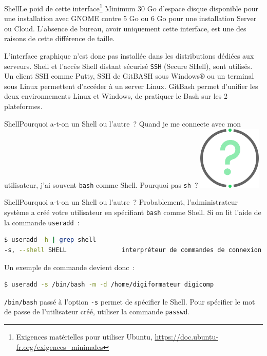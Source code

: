 \documentclass{beamer}
\begin{document}
    \begin{frame}{Shell}{Le poid de cette interface\footnote{Exigences matérielles pour utiliser Ubuntu, \url{https://doc.ubuntu-fr.org/exigences_minimales}}}
        Minimum 30 Go d'espace disque disponible pour une installation avec GNOME contre 5 Go ou 6 Go pour une installation Server ou Cloud.
        \bigbreak
        L'absence de bureau, avoir uniquement cette interface, est une des raisons de cette différence de taille.

        L'interface graphique n'est donc pas installée dans les distributions dédiées aux serveurs.
        Shell et l'accès Shell distant sécurisé \lstinline{SSH} (Secure SHell), sont utilisés.
        Un client SSH comme Putty, SSH de GitBASH sous Windows® ou un terminal sous Linux permettent d'accéder à un server Linux.
        \bigbreak
        GitBash permet d'unifier les deux environnements Linux et Windows, de pratiquer le Bash sur les 2 plateformes.
    \end{frame}

    \begin{frame}{Shell}{Pourquoi a-t-on un Shell ou l'autre~?}
        Quand je me connecte avec mon utilisateur, j'ai souvent \lstinline{bash} comme Shell.
        Pourquoi pas \lstinline{sh}~?
        \bigbreak
        \centering
        \includegraphics[width=3cm]{image/question-mark}
    \end{frame}

    \begin{frame}[fragile]{Shell}{Pourquoi a-t-on un Shell ou l'autre~?}
        Probablement, l'administrateur système a créé votre utilisateur en spécifiant \lstinline{bash} comme Shell.
        \bigbreak
        Si on lit l'aide de la commande \lstinline{useradd}~:
        \begin{lstlisting}[language=bash]
$ useradd -h | grep shell
-s, --shell SHELL               interpréteur de commandes de connexion du nouveau compte
        \end{lstlisting}
        \bigbreak
        Un exemple de commande devient donc~:
        \begin{lstlisting}[language=bash]
$ useradd -s /bin/bash -m -d /home/digiformateur digicomp
        \end{lstlisting}
        \bigbreak
        \lstinline{/bin/bash} passé à l'option \lstinline{-s} permet de spécifier le Shell.
        Pour spécifier le mot de passe de l'utilisateur créé, utiliser la commande \lstinline{passwd}.
    \end{frame}
\end{document}
